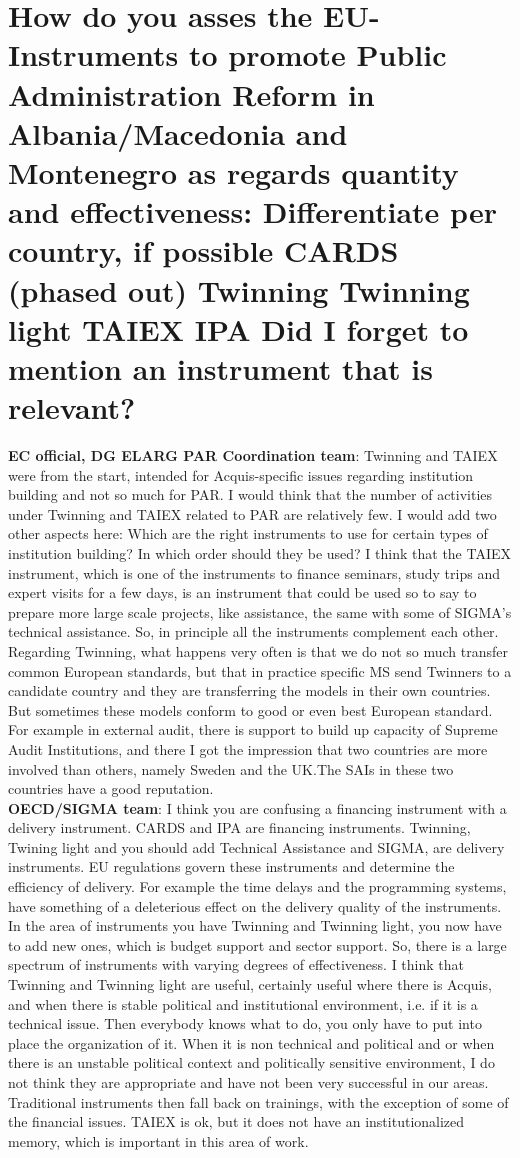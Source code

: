 \section{How do you asses the EU-Instruments to promote Public Administration Reform in
Albania/Macedonia and Montenegro as regards quantity and effectiveness: Differentiate per country, if possible CARDS (phased out) Twinning Twinning light TAIEX IPA Did I forget to mention an instrument that is relevant? }
\label{sec:relevant}
\textbf{EC official, DG ELARG PAR Coordination team}: Twinning and TAIEX were from the start, intended for Acquis-specific issues regarding institution building and not so much for PAR. I would think that the number of activities under Twinning and TAIEX related to PAR are relatively few. I would add two other aspects here: Which are the right instruments to use for certain types of institution building? In which order should they be used? I think that the TAIEX instrument, which is one of the instruments to finance seminars, study trips and expert visits for a few days, is an instrument that could be used so to say to prepare more large scale projects, like assistance, the same with some of SIGMA's technical assistance. So, in principle all the instruments complement each other. Regarding Twinning, what happens very often is that we do not so much transfer common European standards, but that in practice specific MS send Twinners to a candidate country and they are transferring the models in their own countries. But sometimes these models conform to good or even best European standard. For example in external audit, there is support to build up capacity of Supreme Audit Institutions, and there I got the impression that two countries are more involved than others, namely Sweden and the UK.The SAIs in these two countries have a  good reputation.\\
\textbf{OECD/SIGMA team}: I think you are confusing a financing instrument with a delivery instrument. CARDS and IPA are financing instruments. Twinning, Twining light and you should add Technical Assistance and SIGMA, are delivery instruments. EU regulations govern these instruments and determine the efficiency of delivery. For example the time delays and the programming systems, have something of a deleterious effect on the delivery quality of the instruments. In the area of instruments you have Twinning and Twinning light, you now have to add new ones, which is budget support and sector support. So, there is a large spectrum of instruments with varying degrees of effectiveness. I think that Twinning and Twinning light are useful, certainly useful where there is Acquis, and when there is stable political and institutional environment, i.e. if it is a technical issue. Then everybody knows what to do, you only have to put into place the organization of it. When it is non technical and political and or when there is an unstable political context and politically sensitive environment, I do not think they are appropriate and have not been very successful in our areas. Traditional instruments then fall back on trainings, with the exception of some of the financial issues. TAIEX is ok, but it does not have an institutionalized memory, which is important in this area of work.
